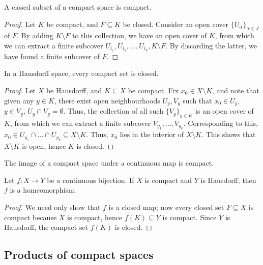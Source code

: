 \documentclass[11pt]{article}
\theoremstyle{definition}
\theoremstyle{remark}
\numberwithin{equation}{section}
\begin{document}
    \begin{lemma}
        A closed subset of a compact space is compact.
    \end{lemma}
    \begin{proof}
        Let $K$ be compact, and $F \subseteq K$ be closed. Consider an open cover
        $\{U_\alpha\}_{\alpha \in J}$ of $F$. By adding $K\setminus F$ to this
        collection, we have an open cover of $K$, from which we can extract a finite
        subcover $U_{i_1}, U_{i_2}, \dots, U_{i_k}, K\setminus F$. By discarding the
        latter, we have found a finite subcover of $F$.
    \end{proof}

    \begin{lemma}
        In a Hausdorff space, every compact set is closed.
    \end{lemma}
    \begin{proof}
        Let $X$ be Hausdorff, and $K \subseteq X$ be compact. Fix $x_0 \in X\setminus
        K$, and note that given any $y \in K$, there exist open neighbourhoods $U_y,
        V_y$ such that $x_0 \in U_y$, $y \in V_y$, $U_y \cap V_y = \emptyset$. Thus,
        the collection of all such $\{V_y\}_{y \in K}$ is an open cover of $K$, from
        which we can extract a finite subcover $V_{y_1}, \dots, V_{y_k}$.
        Corresponding to this, $x_0 \in U_{y_1} \cap \dots \cap U_{y_k} \subseteq X
        \setminus K$. Thus, $x_0$ lies in the interior of $X\setminus K$. This shows
        that $X \setminus K$ is open, hence $K$ is closed.
    \end{proof}

    \begin{theorem}
        The image of a compact space under a continuous map is compact.
    \end{theorem}

    \begin{lemma}
        Let $f\colon X \to Y$ be a continuous bijection. If $X$ is compact and $Y$ is
        Hausdorff, then $f$ is a homeomorphism.
    \end{lemma}
    \begin{proof}
        We need only show that $f$ is a closed map; now every closed set $F \subseteq
        X$ is compact because $X$ is compact, hence $f(K) \subseteq Y$ is compact.
        Since $Y$ is Hausdorff, the compact set $f(K)$ is closed.
    \end{proof}


    \subsection{Products of compact spaces}
\end{document}
